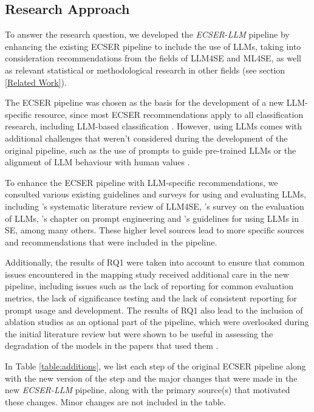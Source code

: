 \documentclass[a4paper]{article}
\newcommand{\newecser}{\textit{ECSER-LLM} }
\begin{document}
\subsection{Research Approach}
To answer the research question, we developed the \newecser pipeline by enhancing the existing ECSER pipeline to include the use of LLMs, taking into consideration recommendations from the fields of LLM4SE and ML4SE, as well as relevant statistical or methodological research in other fields (see section \ref{Related Work}). 

The ECSER pipeline was chosen as the basis for the development of a new LLM-specific resource, since most ECSER recommendations apply to all classification research, including LLM-based classification \cite{Dellanna2022}. However, using LLMs comes with additional challenges that weren't considered during the development of the original pipeline, such as the use of prompts to guide pre-trained LLMs or the alignment of LLM behaviour with human values \cite{liu2024}. 

To enhance the ECSER pipeline with LLM-specific recommendations, we consulted various existing guidelines and surveys for using and evaluating LLMs, including \textcite{hou2024}'s systematic literature review of LLM4SE, \textcite{chang2023}'s survey on the evaluation of LLMs, \textcite{Marvin2024}'s chapter on prompt engineering and \textcite{baltes2025guidelinesempiricalstudiessoftware}'s guidelines for using LLMs in SE, among many others. These higher level sources lead to more specific sources and recommendations that were included in the pipeline.

Additionally, the results of RQ1 were taken into account to ensure that common issues encountered in the mapping study received additional care in the new pipeline, including issues such as the lack of reporting for common evaluation metrics, the lack of significance testing and the lack of consistent reporting for prompt usage and development. The results of RQ1 also lead to the inclusion of ablation studies as an optional part of the pipeline, which were overlooked during the initial literature review but were shown to be useful in assessing the degradation of the models in the papers that used them \cite{meyes2019ablation}.

In Table \ref{table:additions}, we list each step of the original ECSER pipeline along with the new version of the step and the major changes that were made in the new \newecser pipeline, along with the primary source(s) that motivated these changes. Minor changes are not included in the table.
\end{document}
